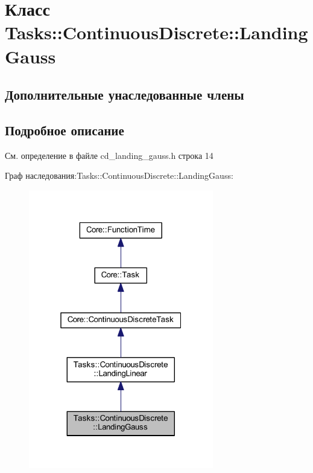 \hypertarget{class_tasks_1_1_continuous_discrete_1_1_landing_gauss}{}\section{Класс Tasks\+:\+:Continuous\+Discrete\+:\+:Landing\+Gauss}
\label{class_tasks_1_1_continuous_discrete_1_1_landing_gauss}
\subsection*{Дополнительные унаследованные члены}


\subsection{Подробное описание}


См. определение в файле cd\+\_\+landing\+\_\+gauss.\+h строка 14



Граф наследования\+:Tasks\+:\+:Continuous\+Discrete\+:\+:Landing\+Gauss\+:\nopagebreak
\begin{figure}[H]
\begin{center}
\leavevmode
\includegraphics[width=229pt]{class_tasks_1_1_continuous_discrete_1_1_landing_gauss__inherit__graph}
\end{center}
\end{figure}


